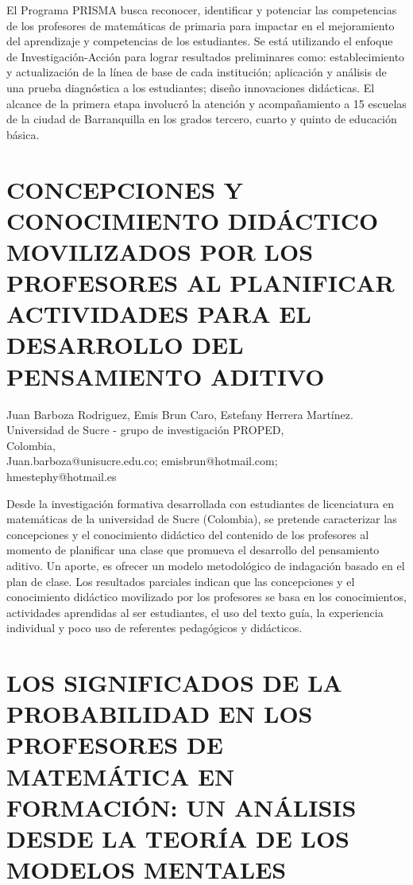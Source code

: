 El Programa PRISMA busca reconocer, identificar y potenciar las competencias
de los profesores de matemáticas de primaria para impactar en el mejoramiento
del aprendizaje y competencias de los estudiantes. Se está utilizando
el enfoque de Investigación-Acción para lograr resultados preliminares
como: establecimiento y actualización de la línea de base de cada
institución; aplicación y análisis de una prueba diagnóstica a los
estudiantes; diseño innovaciones didácticas. El alcance de la primera
etapa involucró la atención y acompañamiento a 15 escuelas de la ciudad
de Barranquilla en los grados tercero, cuarto y quinto de educación
básica. 


\section{CONCEPCIONES Y CONOCIMIENTO DIDÁCTICO MOVILIZADOS POR LOS PROFESORES
AL PLANIFICAR ACTIVIDADES PARA EL DESARROLLO DEL PENSAMIENTO ADITIVO }

\begin{datos}
Juan Barboza Rodriguez, Emis Brun Caro, Estefany Herrera Martínez.\\
Universidad de Sucre - grupo de investigación PROPED,\\
\hfill Colombia, \\
\hfill Juan.barboza@unisucre.edu.co; emisbrun@hotmail.com;\\\hfill hmestephy@hotmail.es
\end{datos}

Desde la investigación formativa desarrollada con estudiantes de licenciatura
en matemáticas de la universidad de Sucre (Colombia), se pretende
caracterizar las concepciones y el conocimiento didáctico del contenido
de los profesores al momento de planificar una clase que promueva
el desarrollo del pensamiento aditivo. Un aporte, es ofrecer un modelo
metodológico de indagación basado en el plan de clase. Los resultados
parciales indican que las concepciones y el conocimiento didáctico
movilizado por los profesores se basa en los conocimientos, actividades
aprendidas al ser estudiantes, el uso del texto guía, la experiencia
individual y poco uso de referentes pedagógicos y didácticos.


\section{LOS SIGNIFICADOS DE LA PROBABILIDAD EN LOS PROFESORES DE MATEMÁTICA
EN FORMACIÓN: UN ANÁLISIS DESDE LA TEORÍA DE LOS MODELOS MENTALES }

